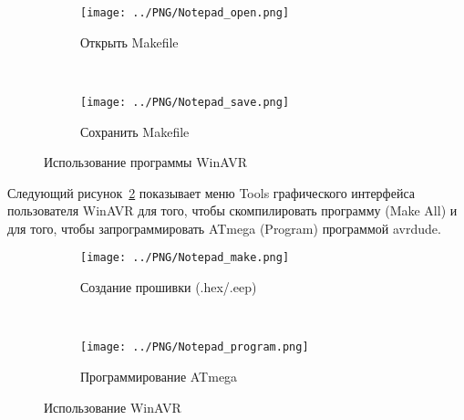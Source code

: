 \begin{figure}[H]
  \begin{subfigure}[b]{.5\textwidth}
    \centering
    \texttt{[image: ../PNG/Notepad\_open.png]}
    \caption{Открыть Makefile}
  \end{subfigure}
  ~
  \begin{subfigure}[b]{.5\textwidth}
    \centering
    \texttt{[image: ../PNG/Notepad\_save.png]}
    \caption{Сохранить Makefile}
  \end{subfigure}
  \caption{Использование программы WinAVR}
  \label{fig:WinAVR1}
\end{figure}

Следующий рисунок~\ref{fig:WinAVR2} показывает меню Tools графического интерфейса пользователя WinAVR для того, чтобы 
скомпилировать программу (Make All) и для того, чтобы запрограммировать ATmega (Program) программой avrdude.

\begin{figure}[H]
  \begin{subfigure}[b]{.5\textwidth}
    \centering
    \texttt{[image: ../PNG/Notepad\_make.png]}
    \caption{Создание прошивки (.hex/.eep)}
  \end{subfigure}
  ~
  \begin{subfigure}[b]{.5\textwidth}
    \centering
    \texttt{[image: ../PNG/Notepad\_program.png]}
    \caption{Программирование ATmega}
  \end{subfigure}
  \caption{Использование WinAVR}
  \label{fig:WinAVR2}
\end{figure}

